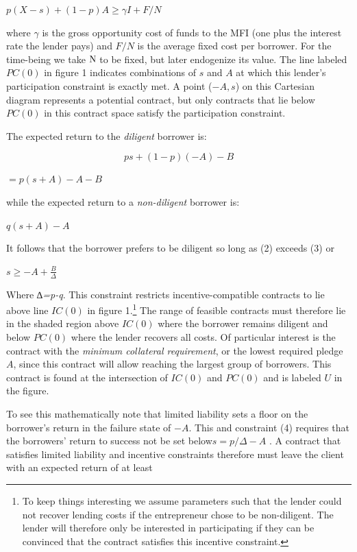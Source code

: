 \documentclass[
]{article}
\begin{document}
\(p(X - s) + (1 - p)A \geq \gamma I + F/N\)

where \(\gamma\) is the gross opportunity cost of funds to the MFI (one
plus the interest rate the lender pays) and \(F/N\) is the average fixed
cost per borrower. For the time-being we take \(\text{N\;}\)to be fixed,
but later endogenize its value. The line labeled \(PC(0)\) in figure 1
indicates combinations of \(s\) and \(A\) at which this lender's
participation constraint is exactly met. A point (\(- A,s\)) on this
Cartesian diagram represents a potential contract, but only contracts
that lie below \(PC(0)\) in this contract space satisfy the
participation constraint.

The expected return to the \emph{diligent} borrower is:

\[ps + (1 - p)( - A) - B\]

\(= p(s + A) - A - B\)

while the expected return to a \emph{non-diligent} borrower is:

\(q(s + A) - A\)

It follows that the borrower prefers to be diligent so long as (2)
exceeds (3) or

\(s \geq - A + \frac{B}{\Delta}\)

Where ∆\emph{=p-q}. This constraint restricts incentive-compatible
contracts to lie above line \(IC(0)\) in figure 1.\footnote{To keep
  things interesting we assume parameters such that the lender could not
  recover lending costs if the entrepreneur chose to be non-diligent.
  The lender will therefore only be interested in participating if they
  can be convinced that the contract satisfies this incentive
  constraint.} The range of feasible contracts must therefore lie in the
shaded region above \(IC(0)\) where the borrower remains diligent and
below \(PC(0)\) where the lender recovers all costs. Of particular
interest is the contract with the \emph{minimum collateral requirement},
or the lowest required pledge \(A\), since this contract will allow
reaching the largest group of borrowers\(.\) This contract is found at
the intersection of \(IC(0)\) and \(PC(0)\) and is labeled \(U\) in the
figure.

To see this mathematically note that limited liability sets a floor on
the borrower's return in the failure state of \(- A\). This and
constraint (4) requires that the borrowers' return to success not be set
below\(s = p/\Delta - A\) . A contract that satisfies limited liability
and incentive constraints therefore must leave the client with an
expected return of at least
\end{document}
